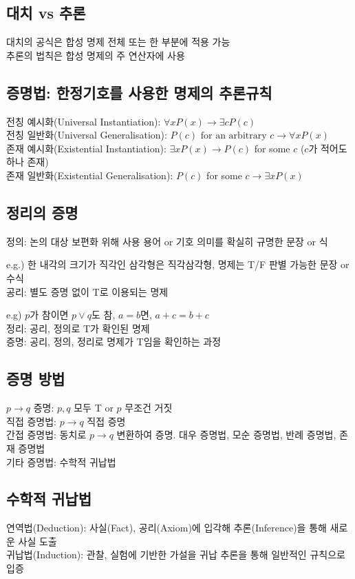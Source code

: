 \subsection{대치 vs 추론}
대치의 공식은 합성 명제 전체 또는 한 부분에 적용 가능\\
추론의 법칙은 합성 명제의 주 연산자에 사용

\subsection{증명법: 한정기호를 사용한 명제의 추론규칙}
전칭 예시화(Universal Instantiation): $\forall x P(x) \to \exists c P(c)$\\
전칭 일반화(Universal Generalisation): $P(c)\text{ for an arbitrary }c \to \forall x P(x)$\\
존재 예시화(Existential Instantiation): $\exists x P(x) \to P(c)$ for some $c$ ($c$가 적어도 하나 존재)\\
존재 일반화(Existential Generalisation): $P(c)$ for some $c \to \exists x P(x)$

\subsection{정리의 증명}
정의: 논의 대상 보편화 위해 사용 용어 or 기호 의미를 확실히 규명한 문장 or 식

e.g.) 한 내각의 크기가 직각인 삼각형은 직각삼각형, 명제는 T/F 판별 가능한 문장 or 수식\\
공리: 별도 증명 없이 T로 이용되는 명제

e.g) $p$가 참이면 $p\lor q$도 참, $a=b$면, $a+c=b+c$\\
정리: 공리, 정의로 T가 확인된 명제\\
증명: 공리, 정의, 정리로 명제가 T임을 확인하는 과정

\subsection{증명 방법}
$p\to q$ 증명: $p, q$ 모두 T or $p$ 무조건 거짓\\
직접 증명법: $p\to q$ 직접 증명\\
간접 증명법: 동치로 $p \to q$ 변환하여 증명. 대우 증명법, 모순 증명법, 반례 증명법, 존재 증명법\\
기타 증명법: 수학적 귀납법

\subsection{수학적 귀납법}
연역법(Deduction): 사실(Fact), 공리(Axiom)에 입각해 추론(Inference)을 통해 새로운 사실 도출\\
귀납법(Induction): 관찰, 실험에 기반한 가설을 귀납 추론을 통해 일반적인 규칙으로 입증

